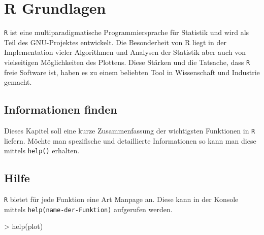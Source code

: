 



\chapter{R Grundlagen}
\lstinline{R} ist eine multiparadigmatische Programmiersprache für 
Statistik und wird als Teil des GNU-Projektes entwickelt. Die 
Besonderheit von R liegt in der Implementation vieler Algorithmen
und Analysen der Statistik aber auch von vielseitigen Möglichkeiten 
des Plottens. Diese Stärken und die Tatsache, dass \lstinline{R} 
freie Software ist, haben es zu einem beliebten Tool in Wissenschaft
und Industrie gemacht.

\newpage


\section*{Informationen finden}
Dieses Kapitel soll eine kurze Zusammenfassung der wichtigsten 
Funktionen in \lstinline{R} liefern. Möchte man spezifische und
detaillierte Informationen so kann man diese mittels \lstinline{help()}
erhalten. 

\section{Hilfe}
\lstinline{R} bietet für jede Funktion eine Art Manpage an. 
Diese kann in der Konsole mittels \lstinline{help(name-der-Funktion)}
aufgerufen werden. 

\begin{Schunk}
\begin{Sinput}
> help(plot)
\end{Sinput}
\end{Schunk}

